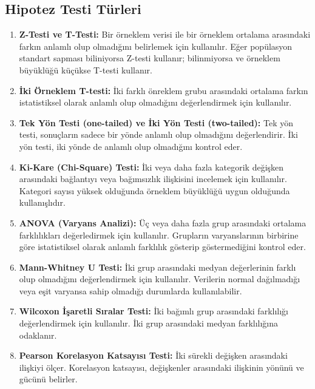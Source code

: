 \subsection{Hipotez Testi Türleri}
\begin{enumerate}
    \item \textbf{Z-Testi ve T-Testi:} Bir örneklem verisi ile bir örneklem ortalama arasındaki farkın anlamlı olup olmadığını belirlemek için kullanılır. Eğer popülasyon standart sapması biliniyorsa Z-testi kullanır; bilinmiyorsa ve örneklem büyüklüğü küçükse T-testi kullanır.
    \item \textbf{İki Örneklem T-testi:} İki farklı önreklem grubu arasındaki ortalama farkın istatistiksel olarak anlamlı olup olmadığını değerlendirmek için kullanılır.
    \item \textbf{Tek Yön Testi (one-tailed) ve İki Yön Testi (two-tailed):} Tek yön testi, sonuçların sadece bir yönde anlamlı olup olmadığını değerlendirir. İki yön testi, iki yönde de anlamlı olup olmadığını kontrol eder.
    \item \textbf{Ki-Kare (Chi-Square) Testi:} İki veya daha fazla kategorik değişken arasındaki bağlantıyı veya bağımsızlık ilişkisini incelemek için kullanılır. Kategori sayısı yüksek olduğunda örneklem büyüklüğü uygun olduğunda kullanışlıdır.
    \item \textbf{ANOVA (Varyans Analizi):} Üç veya daha fazla grup arasındaki ortalama farklılıkları değerledirmek için kullanılır. Grupların varyanslarının birbirine göre istatistiksel olarak anlamlı farklılık gösterip göstermediğini kontrol eder.
    \item \textbf{Mann-Whitney U Testi:} İki grup arasındaki medyan değerlerinin farklı olup olmadığını değerlendirmek için kullanılır. Verilerin normal dağılmadığı veya eşit varyansa sahip olmadığı durumlarda kullanılabilir.
    \item \textbf{Wilcoxon İşaretli Sıralar Testi:} İki bağımlı grup arasındaki farklılığı değerlendirmek için kullanılır. İki grup arasındaki medyan farklılığına odaklanır.
    \item \textbf{Pearson Korelasyon Katsayısı Testi:} İki sürekli değişken arasındaki ilişkiyi ölçer. Korelasyon katsayısı, değişkenler arasındaki ilişkinin yönünü ve gücünü belirler.
\end{enumerate}

\newpage

